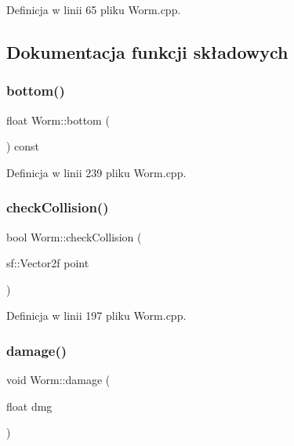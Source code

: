 Definicja w linii 65 pliku Worm.\+cpp.



\subsection{Dokumentacja funkcji składowych}
\mbox{\label{class_worm_a68061fb5be175ab42739a7c157d7073d}} 
\subsubsection{\texorpdfstring{bottom()}{bottom()}}
{\footnotesize\ttfamily float Worm\+::bottom (\begin{DoxyParamCaption}{ }\end{DoxyParamCaption}) const}



Definicja w linii 239 pliku Worm.\+cpp.

\mbox{\label{class_worm_a61589ff1104deb3cbf1cb6978e7f95f4}} 
\subsubsection{\texorpdfstring{check\+Collision()}{checkCollision()}}
{\footnotesize\ttfamily bool Worm\+::check\+Collision (\begin{DoxyParamCaption}\item[{sf\+::\+Vector2f}]{point }\end{DoxyParamCaption})}



Definicja w linii 197 pliku Worm.\+cpp.

\mbox{\label{class_worm_aa57fe22ce4031e5332d16d709e7274c8}} 
\subsubsection{\texorpdfstring{damage()}{damage()}}
{\footnotesize\ttfamily void Worm\+::damage (\begin{DoxyParamCaption}\item[{float}]{dmg }\end{DoxyParamCaption})}



